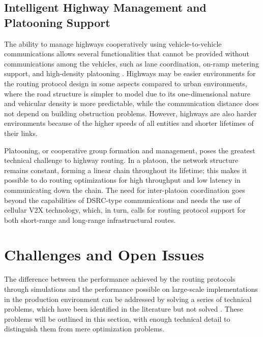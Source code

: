 \documentclass[12pt]{article}
\begin{document}
\subsection{Intelligent Highway Management and Platooning Support}

The ability to manage highways cooperatively using vehicle-to-vehicle communications allows several functionalities that cannot be provided without communications among the vehicles, such as lane coordination, on-ramp metering support, and high-density platooning \cite{hartenstein2008tutorial}. Highways may be easier environments for the routing protocol design in some aspects compared to urban environments, where the road structure is simpler to model due to its one-dimensional nature and vehicular density is more predictable, while the communication distance does not depend on building obstruction problems. However, highways are also harder environments because of the higher speeds of all entities and shorter lifetimes of their links.

Platooning, or cooperative group formation and management, poses the greatest technical challenge to highway routing. In a platoon, the network structure remains constant, forming a linear chain throughout its lifetime; this makes it possible to do routing optimizations for high throughput and low latency in communicating down the chain. The need for inter-platoon coordination goes beyond the capabilities of DSRC-type communications and needs the use of cellular V2X technology, which, in turn, calls for routing protocol support for both short-range and long-range infrastructural routes.


\section{Challenges and Open Issues}

The difference between the performance achieved by the routing protocols through simulations and the performance possible on large-scale implementations in the production environment can be addressed by solving a series of technical problems, which have been identified in the literature but not solved \cite{zheng2015heterogeneous}. These problems will be outlined in this section, with enough technical detail to distinguish them from mere optimization problems.
\end{document}
